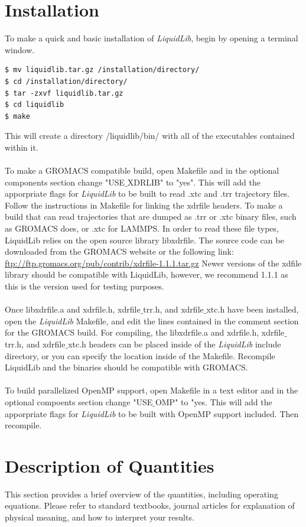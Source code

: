 \documentclass{article}
\begin{document}
\section{Installation}
To make a quick and basic installation of \textit{LiquidLib}, begin by opening a terminal window.
\begin{lstlisting}[style=BashInputStyle]
$ mv liquidlib.tar.gz /installation/directory/
$ cd /installation/directory/
$ tar -zxvf liquidlib.tar.gz
$ cd liquidlib
$ make
\end{lstlisting}
This will create a directory /liquidlib/bin/ with all of the executables contained within it.
\\
\\
To make a GROMACS compatible build, open Makefile and in the optional components section change "USE$\_$XDRLIB" to "yes".  This will add the apporpriate flags for \textit{LiquidLib} to be built to read .xtc and .trr trajectory files.  Follow the instructions in Makefile for linking the xdrfile headers. To make a build that can read trajectories that are dumped as .trr or .xtc binary files, such as GROMACS does, or .xtc for LAMMPS.  In order to read these file types, LiquidLib relies on the open source library libxdrfile.  The source code can be downloaded from the GROMACS website or the following link: \url{ftp://ftp.gromacs.org/pub/contrib/xdrfile-1.1.1.tar.gz} Newer versions of the xdfile library should be compatible with LiquidLib, however, we recommend 1.1.1 as this is the version used for testing purposes.
\\
\\
Once libxdrfile.a and xdrfile.h, xdrfile$\_$trr.h, and xdrfile$\_$xtc.h have been installed, open the \textit{LiquidLib} Makefile, and edit the lines contained in the comment section for the GROMACS build.  For compiling, the libxdrfile.a and xdrfile.h, xdrfile$\_$trr.h, and xdrfile$\_$xtc.h headers can be placed inside of the \textit{LiquidLib} include directory, or you can specify the location inside of the Makefile.  Recompile LiquidLib and the binaries should be compatible with GROMACS.
\\
\\
To build parallelized OpenMP support, open Makefile in a text editor and in the optional compoents section change "USE$\_$OMP" to "yes.  This will add the apporpriate flags for \textit{LiquidLib} to be built with OpenMP support included.  Then recompile.


\section{Description of Quantities}
This section provides a brief overview of the quantities, including operating equations. Please refer to standard textbooks, journal articles for explanation of physical meaning, and how to interpret your results.
\end{document}
